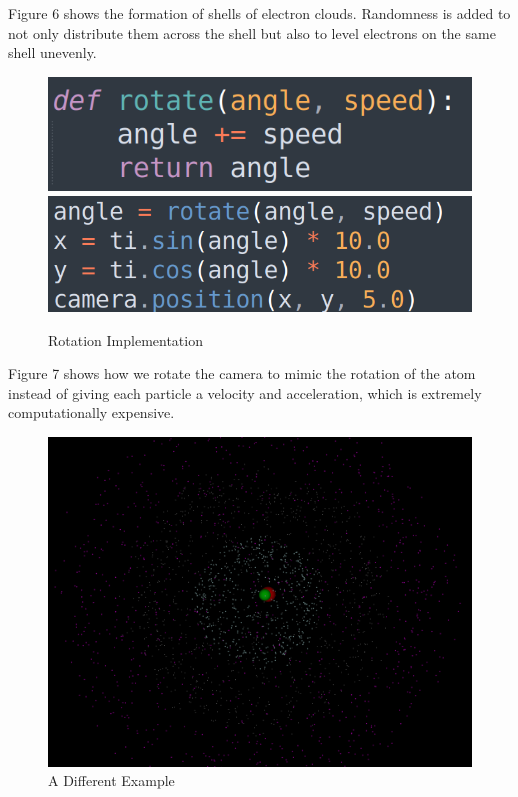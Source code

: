 \documentclass[acmtog]{acmart}
\begin{document}
Figure 6 shows the formation of shells of electron clouds. Randomness is added to not only distribute them across the shell but also to level electrons on the same shell unevenly.

\begin{figure}[h]
  \centering
  \includegraphics[width=\linewidth]{./rotate.png}
  \includegraphics[width=\linewidth]{./camera.png}
  \caption{Rotation Implementation}
\end{figure}

Figure 7 shows how we rotate the camera to mimic the rotation of the atom instead of giving each particle a velocity and acceleration, which is extremely computationally expensive.

\begin{figure}[h]
  \centering
  \includegraphics[width=\linewidth]{./example.png}
  \caption{A Different Example}
\end{figure}
\end{document}
